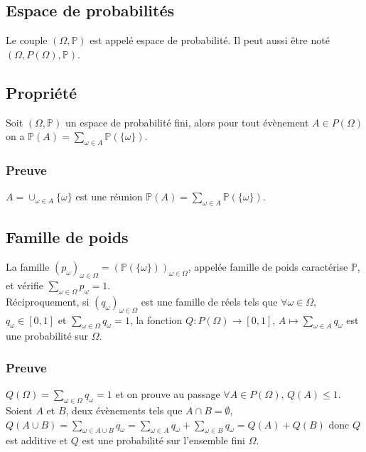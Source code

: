 \documentclass[a4paper,10pt]{book} %
\renewcommand{\P}{\mathbb{P}} %
\begin{document}
\subsection{Espace de probabilités}
Le couple $(\Omega, \P)$ est appelé espace de probabilité. Il peut aussi être noté $(\Omega, P(\Omega),\P)$.

\subsection{Propriété}
Soit $(\Omega,\P)$ un espace de probabilité fini, alors pour tout évènement $A\in P(\Omega)$\\on a $\displaystyle \P(A)=\sum_{\omega\in A}\P(\{\omega\})$.

\subsubsection{Preuve}
$A=\cup_{\omega\in A}\{\omega\}$ est une réunion $\displaystyle \P(A)=\sum_{\omega\in A}\P(\{\omega\})$.

\subsection{Famille de poids}
La famille $(p_\omega)_{\omega\in \Omega}=(\P(\{\omega\}))_{\omega\in\Omega}$, appelée famille de poids caractérise $\P$, et vérifie $\displaystyle \sum_{\omega\in \Omega}p_\omega=1$.\\

Réciproquement, si $(q_\omega)_{\omega\in\Omega}$ est une famille de réels tels que $\forall \omega\in \Omega$, $q_\omega\in [0,1]$ et $\displaystyle \sum_{\omega\in \Omega}q_\omega=1$, la fonction $Q:P(\Omega)\rightarrow [0,1]$, $\displaystyle A\mapsto \sum_{\omega\in A}q_\omega$ est une probabilité sur $\Omega$.

\subsubsection{Preuve}
$\displaystyle Q(\Omega)=\sum_{\omega\in \Omega}q_\omega=1$ et on prouve au passage $\forall A\in P(\Omega)$, $Q(A)\leq 1$.\\

Soient $A$ et $B$, deux évènements tels que $A\cap B=\emptyset$,\\$\displaystyle Q(A\cup B)=\sum_{\omega\in A\cup B}q_\omega=\sum_{\omega\in A}q_\omega+\sum_{\omega\in B}q_\omega=Q(A)+Q(B)$ donc $Q$ est additive et $Q$ est une probabilité sur l'ensemble fini $\Omega$.
\end{document}
